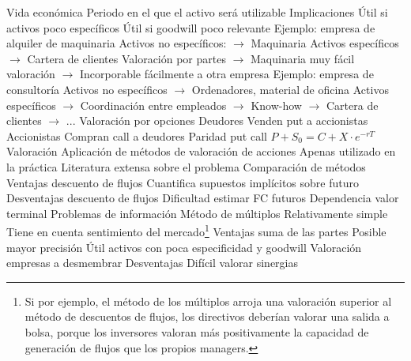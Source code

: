 \documentclass{nuevotema}
\begin{document}
\begin{esquemal}
				\4 Vida económica
				\4[] Periodo en el que el activo será utilizable
			\3 Implicaciones
				\4 Útil si activos poco específicos
				\4 Útil si goodwill poco relevante
				\4 Ejemplo: empresa de alquiler de maquinaria
				\4[] Activos no específicos:
				\4[] $\to$ Maquinaria
				\4[] Activos específicos
				\4[] $\to$ Cartera de clientes
				\4[] Valoración por partes
				\4[] $\to$ Maquinaria muy fácil valoración
				\4[] $\to$ Incorporable fácilmente a otra empresa
				\4 Ejemplo: empresa de consultoría
				\4[] Activos no específicos
				\4[] $\to$ Ordenadores, material de oficina
				\4[] Activos específicos
				\4[] $\to$ Coordinación entre empleados
				\4[] $\to$ Know-how
				\4[] $\to$ Cartera de clientes
				\4[] $\to$ ...
		\2 Valoración por opciones
			\3 Deudores
				\4 Venden put a accionistas
			\3 Accionistas
				\4 Compran call a deudores
			\3 Paridad put call
				\4[] $P + S_0 = C + X\cdot e^{-rT}$
			\3 Valoración
				\4 Aplicación de métodos de valoración de acciones
				\4 Apenas utilizado en la práctica
				\4 Literatura extensa sobre el problema
		\2 Comparación de métodos
			\3 Ventajas descuento de flujos
				\4 Cuantifica supuestos implícitos sobre futuro
			\3 Desventajas descuento de flujos
				\4 Dificultad estimar FC futuros
				\4 Dependencia valor terminal
				\4 Problemas de información
			\3 Método de múltiplos
				\4 Relativamente simple
				\4 Tiene en cuenta sentimiento del mercado\footnote{Si por ejemplo, el método de los múltiplos arroja una valoración superior al método de descuentos de flujos, los directivos deberían valorar una salida a bolsa, porque los inversores valoran más positivamente la capacidad de generación de flujos que los propios managers.}
			\3 Ventajas suma de las partes
				\4 Posible mayor precisión
				\4 Útil activos con poca especificidad y goodwill
				\4 Valoración empresas a desmembrar
			\3 Desventajas
				\4 Difícil valorar sinergias


\end{esquemal}
\end{document}
